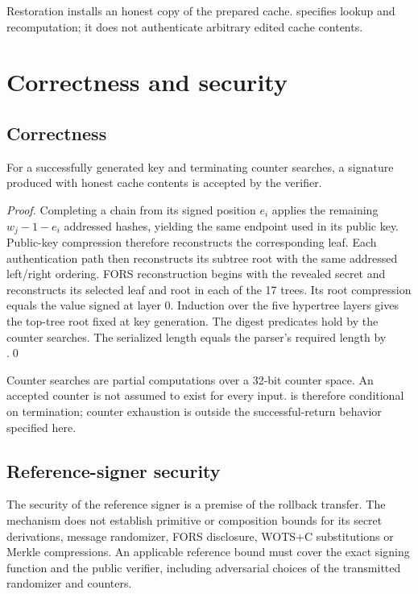 \documentclass[a4paper,envcountsame,runningheads]{llncs}
\begin{document}
Restoration installs an honest copy of the prepared cache.  specifies lookup and recomputation; it does not authenticate arbitrary edited cache contents.

\section{Correctness and security}\label{sec:security}
\subsection{Correctness}\label{sec:correctness}
\begin{lemma}\label{lem:correct}
For a successfully generated key and terminating counter searches, a signature produced with honest cache contents is accepted by the verifier.
\end{lemma}
\begin{proof}
Completing a chain from its signed position $e_i$ applies the remaining $w_j-1-e_i$ addressed hashes, yielding the same endpoint used in its public key. Public-key compression therefore reconstructs the corresponding leaf. Each authentication path then reconstructs its subtree root with the same addressed left/right ordering. FORS reconstruction begins with the revealed secret and reconstructs its selected leaf and root in each of the 17 trees. Its root compression equals the value signed at layer 0. Induction over the five hypertree layers gives the top-tree root fixed at key generation. The digest predicates hold by the counter searches. The serialized length equals the parser's required length by .\qed
\end{proof}

Counter searches are partial computations over a 32-bit counter space. An accepted counter is not assumed to exist for every input.  is therefore conditional on termination; counter exhaustion is outside the successful-return behavior specified here.

\subsection{Reference-signer security}
The security of the reference signer is a premise of the rollback transfer. The mechanism does not establish primitive or composition bounds for its secret derivations, message randomizer, FORS disclosure, WOTS+C substitutions or Merkle compressions. An applicable reference bound must cover the exact signing function and the public verifier, including adversarial choices of the transmitted randomizer and counters.
\end{document}
